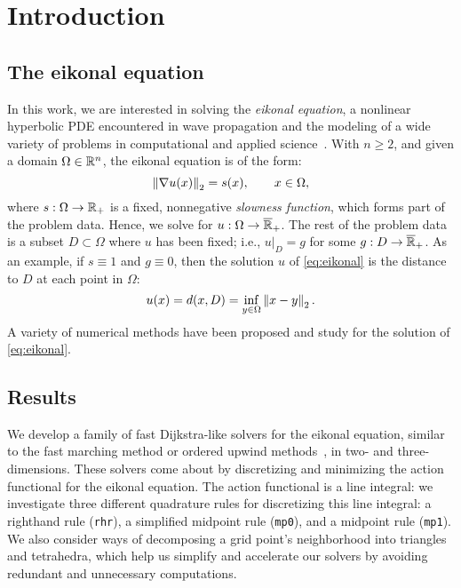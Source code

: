 \documentclass[eikonal.tex]{subfiles}
\begin{document}
\section{Introduction}\label{sec:introduction}

\subsection{The eikonal equation}

In this work, we are interested in solving the \emph{eikonal
  equation}, a nonlinear hyperbolic PDE encountered in wave
propagation and the modeling of a wide variety of problems in
computational and applied science~\cite{sethian1999level}. With
$n \geq 2$, and given a domain $\Omega \in \mathbb{R}^n$, the eikonal equation
is of the form:
\begin{equation}\label{eq:eikonal}
  \norm{\nabla u(x)}_2 = s(x), \qquad x \in \Omega,
\end{equation}
where $s : \Omega \to \mathbb{R}_+$ is a fixed, nonnegative \emph{slowness
  function}, which forms part of the problem data. Hence, we solve for
$u : \Omega \to \overline{\mathbb{R}}_+$. The rest of the problem data is a
subset $D \subset \Omega$ where $u$ has been fixed; i.e.,
$\left. u \right|_D = g$ for some $g : D \to \overline{\mathbb{R}}_+$. As an
example, if $s \equiv 1$ and $g \equiv 0$, then the solution $u$ of
\cref{eq:eikonal} is the distance to $D$ at each point in $\Omega$:
\begin{equation}
  \label{eq:distance-to-Omega}
  u(x) = d(x, D) = \inf_{y \in \Omega} \norm{x - y}_2.
\end{equation}
A variety of numerical methods have been proposed and study for the
solution of \cref{eq:eikonal}.

\subsection{Results}

We develop a family of fast Dijkstra-like solvers for the eikonal
equation, similar to the fast marching method or ordered upwind
methods~\cite{sethian1996fast,sethian2003ordered}, in two- and three-
dimensions. These solvers come about by discretizing and minimizing
the action functional for the eikonal equation. The action functional
is a line integral: we investigate three different quadrature rules
for discretizing this line integral: a righthand rule (\texttt{rhr}),
a simplified midpoint rule (\texttt{mp0}), and a midpoint rule
(\texttt{mp1}). We also consider ways of decomposing a grid point's
neighborhood into triangles and tetrahedra, which help us simplify and
accelerate our solvers by avoiding redundant and unnecessary
computations.
\end{document}
